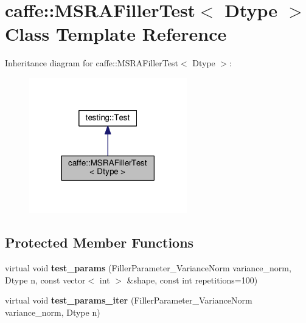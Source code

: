 \hypertarget{classcaffe_1_1_m_s_r_a_filler_test}{}\section{caffe\+:\+:M\+S\+R\+A\+Filler\+Test$<$ Dtype $>$ Class Template Reference}
\label{classcaffe_1_1_m_s_r_a_filler_test}


Inheritance diagram for caffe\+:\+:M\+S\+R\+A\+Filler\+Test$<$ Dtype $>$\+:
\nopagebreak
\begin{figure}[H]
\begin{center}
\leavevmode
\includegraphics[width=194pt]{classcaffe_1_1_m_s_r_a_filler_test__inherit__graph}
\end{center}
\end{figure}
\subsection*{Protected Member Functions}
\begin{DoxyCompactItemize}
\item 
\mbox{\label{classcaffe_1_1_m_s_r_a_filler_test_a369a0e1468c15414b30cfaa01e410e0d}} 
virtual void {\bfseries test\+\_\+params} (Filler\+Parameter\+\_\+\+Variance\+Norm variance\+\_\+norm, Dtype n, const vector$<$ int $>$ \&shape, const int repetitions=100)
\item 
\mbox{\label{classcaffe_1_1_m_s_r_a_filler_test_af44a26d09d127a0e55708b511e2ab71a}} 
virtual void {\bfseries test\+\_\+params\+\_\+iter} (Filler\+Parameter\+\_\+\+Variance\+Norm variance\+\_\+norm, Dtype n)
\end{DoxyCompactItemize}
